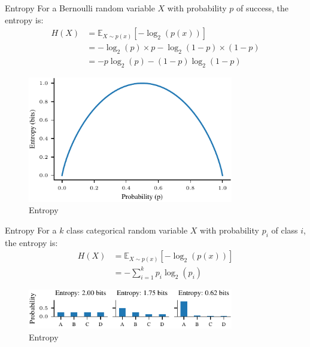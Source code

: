 \documentclass[handout]{beamer}
\begin{document}
\begin{frame}{Entropy}
    For a Bernoulli random variable $X$ with probability $p$ of success, the entropy is:
    \begin{align*}
        H(X) &= \mathbb{E}_{X \sim p(x)}[-\log_2(p(x))] \\
        &= -\log_2(p) \times p - \log_2(1-p) \times (1-p) \\
        &= -p\log_2(p) - (1-p)\log_2(1-p)
    \end{align*}
    \begin{figure}
        \centering
        \includegraphics[width=0.8\textwidth]{notebooks/figures/information-theory/entropy-bernoulli.pdf}
        \caption{Entropy}
        \label{fig:entropy}
    \end{figure}
    
\end{frame}

\begin{frame}{Entropy}
    For a $k$ class categorical random variable $X$ with probability $p_i$ of class $i$, the entropy is:
    \begin{align*}
        H(X) &= \mathbb{E}_{X \sim p(x)}[-\log_2(p(x))] \\
        &= -\sum_{i=1}^k p_i \log_2(p_i)
    \end{align*}

    \begin{figure}
        \centering
        \includegraphics[width=0.8\textwidth]{notebooks/figures/information-theory/categorical-entropy.pdf}
        \caption{Entropy}
        \label{fig:entropy_categorical}
    \end{figure}
    
\end{frame}
\end{document}
